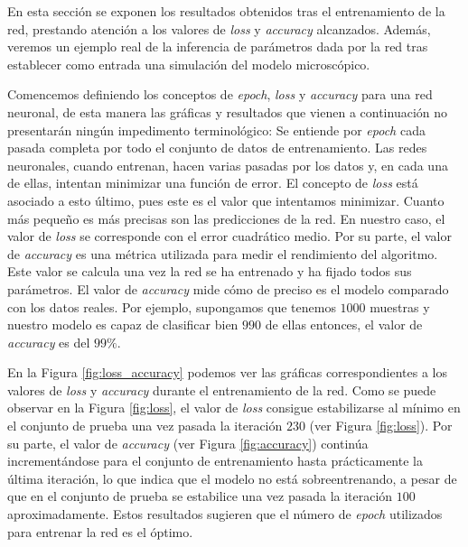En esta sección se exponen los resultados obtenidos tras el entrenamiento de la red, prestando atención a los valores de \textit{loss} y \textit{accuracy} alcanzados. Además, veremos un ejemplo real de la inferencia de parámetros dada por la red tras establecer como entrada una simulación del modelo microscópico. 

Comencemos definiendo los conceptos de \textit{epoch}, \textit{loss} y \textit{accuracy} para una red neuronal, de esta manera las gráficas y resultados que vienen a continuación no presentarán ningún impedimento terminológico: Se entiende por \textit{epoch} cada pasada completa por todo el conjunto de datos de entrenamiento. Las redes neuronales, cuando entrenan, hacen varias pasadas por los datos y, en cada una de ellas, intentan minimizar una función de error. El concepto de \textit{loss} está asociado a esto último, pues este es el valor que intentamos minimizar. Cuanto más pequeño es más precisas son las predicciones de la red. En nuestro caso, el valor de \textit{loss} se corresponde con el error cuadrático medio. Por su parte, el valor de \textit{accuracy} es una métrica utilizada para medir el rendimiento del algoritmo. Este valor se calcula una vez la red se ha entrenado y ha fijado todos sus parámetros. El valor de \textit{accuracy} mide cómo de preciso es el modelo comparado con los datos reales. Por ejemplo, supongamos que tenemos $1000$ muestras y nuestro modelo es capaz de clasificar bien $990$ de ellas entonces, el valor de \textit{accuracy} es del $99\%$.

En la Figura \ref{fig:loss_accuracy} podemos ver las gráficas correspondientes a los valores de \textit{loss} y \textit{accuracy} durante el entrenamiento de la red. Como se puede observar en la Figura \ref{fig:loss}, el valor de \textit{loss} consigue estabilizarse al mínimo en el conjunto de prueba una vez pasada la iteración $230$ (ver Figura \ref{fig:loss}). Por su parte, el valor de \textit{accuracy} (ver Figura \ref{fig:accuracy}) continúa incrementándose para el conjunto de entrenamiento hasta prácticamente la última iteración, lo que indica que el modelo no está sobreentrenando, a pesar de que en el conjunto de prueba se estabilice una vez pasada la iteración $100$ aproximadamente. Estos resultados sugieren que el número de \textit{epoch} utilizados para entrenar la red es el óptimo.


%	
%	
%	

